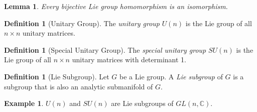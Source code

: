 \documentclass{book}
\newtheorem{lm}[prop]{Lemma}
\theoremstyle{definition}
\newtheorem{df}[prop]{Definition}
\newtheorem{ex}[prop]{Example}
\begin{document}
\begin{lm}
Every bijective Lie group homomorphism is an isomorphism.
\end{lm}


\begin{df}[Unitary Group]
The \emph{unitary group} $U(n)$ is the Lie group of all $n \times n$ unitary matrices.
\end{df}

\begin{df}[Special Unitary Group]
The \emph{special unitary group} $SU(n)$ is the Lie group of all $n \times n$ unitary matrices with determinant 1.
\end{df}

\begin{df}[Lie Subgroup]
Let $G$ be a Lie group. A \emph{Lie subgroup} of $G$ is a subgroup that is also an analytic submanifold of $G$.
\end{df}

\begin{ex}
$U(n)$ and $SU(n)$ are Lie subgroups of $GL(n, \mathbb{C})$.
\end{ex}
\end{document}
